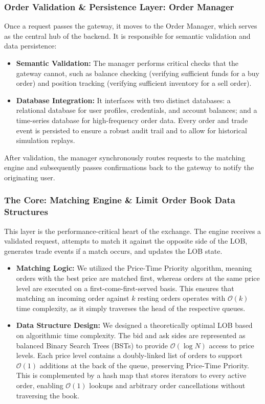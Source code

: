 \documentclass[12pt,a4paper]{article}
\begin{document}
\subsubsection{Order Validation \& Persistence Layer: Order Manager}
Once a request passes the gateway, it moves to the Order Manager, which serves as the central hub of the backend. It is responsible for semantic validation and data persistence:
\begin{itemize}
    \item \textbf{Semantic Validation:} The manager performs critical checks that the gateway cannot, such as balance checking (verifying sufficient funds for a buy order) and position tracking (verifying sufficient inventory for a sell order).
    \item \textbf{Database Integration:} It interfaces with two distinct databases: a relational database for user profiles, credentials, and account balances; and a time-series database for high-frequency order data. Every order and trade event is persisted to ensure a robust audit trail and to allow for historical simulation replays.
\end{itemize}
After validation, the manager synchronously routes requests to the matching engine and subsequently passes confirmations back to the gateway to notify the originating user.

\subsubsection{The Core: Matching Engine \& Limit Order Book Data Structures}
This layer is the performance-critical heart of the exchange. The engine receives a validated request, attempts to match it against the opposite side of the LOB, generates trade events if a match occurs, and updates the LOB state.
\begin{itemize}
    \item \textbf{Matching Logic:} We utilized the Price-Time Priority algorithm, meaning orders with the best price are matched first, whereas orders at the same price level are executed on a first-come-first-served basis. This ensures that matching an incoming order against $k$ resting orders operates with $\mathcal{O}(k)$ time complexity, as it simply traverses the head of the respective queues.
    \item \textbf{Data Structure Design:} We designed a theoretically optimal LOB based on algorithmic time complexity. The bid and ask sides are represented as balanced Binary Search Trees (BSTs) to provide $\mathcal{O}(\log N)$ access to price levels. Each price level contains a doubly-linked list of orders to support $\mathcal{O}(1)$ additions at the back of the queue, preserving Price-Time Priority. This is complemented by a hash map that stores iterators to every active order, enabling $\mathcal{O}(1)$ lookups and arbitrary order cancellations without traversing the book.
\end{itemize}
\end{document}
